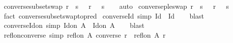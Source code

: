 \begin{isabellebody}
%
\endisadelimproof
\isanewline
{}\isamarkupfalse%
\ converse{\isacharunderscore}{\kern0pt}subset{\isacharunderscore}{\kern0pt}swap{\isacharcolon}{\kern0pt}\ {\isachardoublequoteopen}r\ {\isasymsubseteq}\ s\ {\isasyminverse}\ {\isasymlongleftrightarrow}\ r\ {\isasyminverse}\ {\isasymsubseteq}\ s{\isachardoublequoteclose}\isanewline
%
\isadelimproof
\ \ %
\endisadelimproof
%
\isatagproof
{}\isamarkupfalse%
\ auto%
\endisatagproof
{\isafoldproof}%
%
\isadelimproof
\isanewline
%
\endisadelimproof
\isanewline
{}\isamarkupfalse%
\ conversep{\isacharunderscore}{\kern0pt}le{\isacharunderscore}{\kern0pt}swap{\isacharcolon}{\kern0pt}\ {\isachardoublequoteopen}r\ {\isasymle}\ s\ {\isasyminverse}{\isasyminverse}\ {\isasymlongleftrightarrow}\ r\ {\isasyminverse}{\isasyminverse}\ {\isasymle}\ s{\isachardoublequoteclose}\isanewline
%
\isadelimproof
\ \ %
\endisadelimproof
%
\isatagproof
{}\isamarkupfalse%
\ {\isacharparenleft}{\kern0pt}fact\ converse{\isacharunderscore}{\kern0pt}subset{\isacharunderscore}{\kern0pt}swap{\isacharbrackleft}{\kern0pt}to{\isacharunderscore}{\kern0pt}pred{\isacharbrackright}{\kern0pt}{\isacharparenright}{\kern0pt}%
\endisatagproof
{\isafoldproof}%
%
\isadelimproof
\isanewline
%
\endisadelimproof
\isanewline
{}\isamarkupfalse%
\ converse{\isacharunderscore}{\kern0pt}Id\ {\isacharbrackleft}{\kern0pt}simp{\isacharbrackright}{\kern0pt}{\isacharcolon}{\kern0pt}\ {\isachardoublequoteopen}Id{\isasyminverse}\ {\isacharequal}{\kern0pt}\ Id{\isachardoublequoteclose}\isanewline
%
\isadelimproof
\ \ %
\endisadelimproof
%
\isatagproof
{}\isamarkupfalse%
\ blast%
\endisatagproof
{\isafoldproof}%
%
\isadelimproof
\isanewline
%
\endisadelimproof
\isanewline
{}\isamarkupfalse%
\ converse{\isacharunderscore}{\kern0pt}Id{\isacharunderscore}{\kern0pt}on\ {\isacharbrackleft}{\kern0pt}simp{\isacharbrackright}{\kern0pt}{\isacharcolon}{\kern0pt}\ {\isachardoublequoteopen}{\isacharparenleft}{\kern0pt}Id{\isacharunderscore}{\kern0pt}on\ A{\isacharparenright}{\kern0pt}{\isasyminverse}\ {\isacharequal}{\kern0pt}\ Id{\isacharunderscore}{\kern0pt}on\ A{\isachardoublequoteclose}\isanewline
%
\isadelimproof
\ \ %
\endisadelimproof
%
\isatagproof
{}\isamarkupfalse%
\ blast%
\endisatagproof
{\isafoldproof}%
%
\isadelimproof
\isanewline
%
\endisadelimproof
\isanewline
{}\isamarkupfalse%
\ refl{\isacharunderscore}{\kern0pt}on{\isacharunderscore}{\kern0pt}converse\ {\isacharbrackleft}{\kern0pt}simp{\isacharbrackright}{\kern0pt}{\isacharcolon}{\kern0pt}\ {\isachardoublequoteopen}refl{\isacharunderscore}{\kern0pt}on\ A\ {\isacharparenleft}{\kern0pt}converse\ r{\isacharparenright}{\kern0pt}\ {\isacharequal}{\kern0pt}\ refl{\isacharunderscore}{\kern0pt}on\ A\ r{\isachardoublequoteclose}\isanewline

\end{isabellebody}
